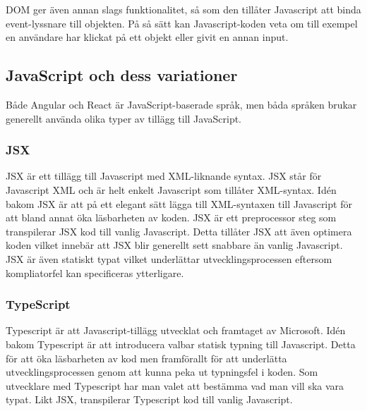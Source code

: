 DOM ger även annan slags funktionalitet, så som den tillåter Javascript att binda event-lyssnare till objekten.\cite{w3-event} På så sätt kan Javascript-koden veta om till exempel en användare har klickat på ett objekt eller givit en annan input.


\subsection{JavaScript och dess variationer}
Både Angular och React är JavaScript-baserade språk, men båda språken brukar generellt använda olika typer av tillägg till JavaScript.

\subsubsection{JSX}
JSX är ett tillägg till Javascript med XML-liknande syntax. JSX står för Javascript XML och är helt enkelt Javascript som tillåter XML-syntax. Idén bakom JSX är att på ett elegant sätt lägga till XML-syntaxen till Javascript för att bland annat öka läsbarheten av koden.\cite{react-jsx} JSX är ett preprocessor steg som transpilerar JSX kod till vanlig Javascript. Detta tillåter JSX att även optimera koden vilket innebär att JSX blir generellt sett snabbare än vanlig Javascript.\cite{jsx} \cite{facebook-jsx} JSX är även statiskt typat vilket underlättar utvecklingsprocessen eftersom kompliatorfel kan specificeras ytterligare.


\subsubsection{TypeScript}
Typescript är att Javascript-tillägg utvecklat och framtaget av Microsoft. Idén bakom Typescript är att introducera valbar statisk typning till Javascript. \cite{typescript} Detta för att öka läsbarheten av kod men framförallt för att underlätta utvecklingsprocessen genom att kunna peka ut typningsfel i koden. Som utvecklare med Typescript har man valet att bestämma vad man vill ska vara typat. Likt JSX, transpilerar Typescript kod till vanlig Javascript. \cite{typescript-book}


